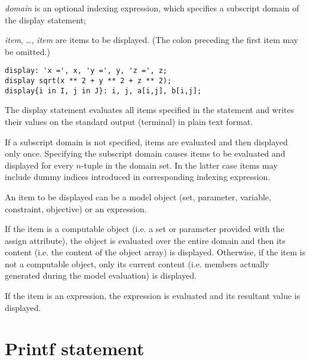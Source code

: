 \documentclass[11pt]{report}
\def\para#1{\noindent{\bf#1}}
\begin{document}
\noindent
{}

\medskip

\noindent
{\it domain} is an optional indexing expression, which specifies
a subscript domain of the display statement;

\noindent
{\it item}, \dots, {\it item} are items to be displayed. (The colon
preceding the first item may be omitted.)

\para{Examples}

\begin{verbatim}
display: 'x =', x, 'y =', y, 'z =', z;
display sqrt(x ** 2 + y ** 2 + z ** 2);
display{i in I, j in J}: i, j, a[i,j], b[i,j];
\end{verbatim}

The display statement evaluates all items specified in the statement
and writes their values on the standard output (terminal) in plain text
format.

If a subscript domain is not specified, items are evaluated and then
displayed only once. Specifying the subscript domain causes items to be
evaluated and displayed for every $n$-tuple in the domain set. In the
latter case items may include dummy indices introduced in corresponding
indexing expression.

An item to be displayed can be a model object (set, parameter,
variable, constraint, objective) or an expression.

If the item is a computable object (i.e. a set or parameter provided
with the assign attribute), the object is evaluated over the entire
domain and then its content (i.e. the content of the object array) is
displayed. Otherwise, if the item is not a computable object, only its
current content (i.e. members actually generated during the model
evaluation) is displayed.

If the item is an expression, the expression is evaluated and its
resultant value is displayed.

\section{Printf statement}

\noindent
{}
\end{document}
